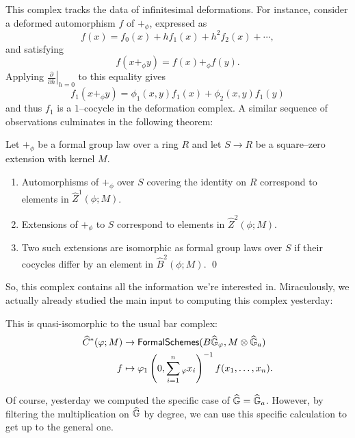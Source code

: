 This complex tracks the data of infinitesimal deformations.  For instance, consider a deformed automorphism $f$ of $+_\phi$, expressed as \[f(x) = f_0(x) + h f_1(x) + h^2 f_2(x) + \cdots,\] and satisfying \[f(x +_\phi y) = f(x) +_\phi f(y).\]  Applying $\left.\frac{\partial}{\partial h}\right|_{h=0}$ to this equality gives \[f_1(x +_\phi y) = \phi_1(x, y)f_1(x) + \phi_2(x, y)f_1(y)\] and thus $f_1$ is a $1$--cocycle in the deformation complex.  A similar sequence of observations culminates in the following theorem:
\begin{theorem}
Let $+_\phi$ be a formal group law over a ring $R$ and let $S \to R$ be a square--zero extension with kernel $M$.
\begin{enumerate}
\item Automorphisms of $+_\phi$ over $S$ covering the identity on $R$ correspond to elements in $\widehat Z^1(\phi; M)$.
\item Extensions of $+_\phi$ to $S$ correspond to elements in $\widehat Z^2(\phi; M)$.
\item Two such extensions are isomorphic as formal group laws over $S$ if their cocycles differ by an element in $\widehat B^2(\phi; M)$. \qed
\end{enumerate}
\end{theorem}

So, this complex contains all the information we're interested in.  Miraculously, we actually already studied the main input to computing this complex yesterday:

\begin{lemma}
This is quasi-isomorphic to the usual bar complex:
\begin{align*}
\widehat C^*(\phi; M) & \to \CatOf{FormalSchemes}(B\G_\phi, M \otimes \G_a) \\
f & \mapsto \phi_1\left(0, \sum_{i=1}^n{}_\phi x_i \right)^{-1} f(x_1, \ldots, x_n). \qed
\end{align*}
\end{lemma}

Of course, yesterday we computed the specific case of $\widehat{\mathbb G} = \widehat{\mathbb G}_a$.  However, by filtering the multiplication on $\widehat{\mathbb G}$ by degree, we can use this specific calculation to get up to the general one.

